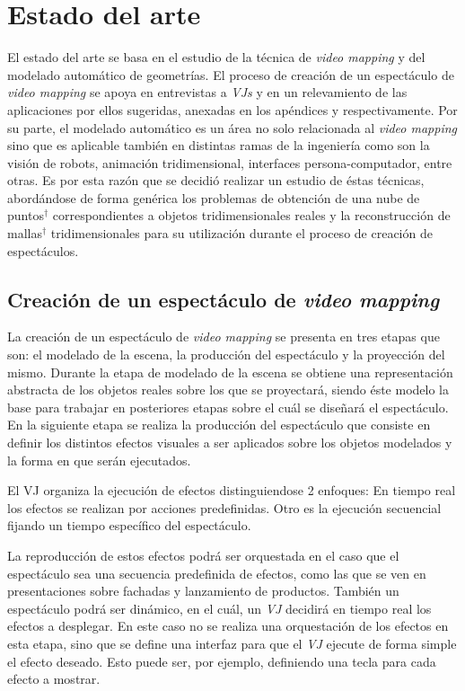 \chapter{Estado del arte}

El estado del arte se basa en el estudio de la técnica de \emph{video mapping} y del modelado automático de geometrías.
El proceso de creación de un espectáculo de \emph{video mapping} se apoya en entrevistas a \emph{VJs} y en un relevamiento de las aplicaciones por ellos sugeridas, anexadas en los apéndices  y  respectivamente.
Por su parte, el modelado automático es un área no solo relacionada al \emph{video mapping} sino que es aplicable también en distintas ramas de la ingeniería como son la visión de robots, animación tridimensional, interfaces persona-computador, entre otras. Es por esta razón que se decidió realizar un estudio de éstas técnicas, abordándose de forma genérica los problemas de obtención de una nube de puntos$^\dagger$ correspondientes a objetos tridimensionales reales y la reconstrucción de mallas$^\dagger$ tridimensionales para su utilización durante el proceso de creación de espectáculos.

\section{Creación de un espectáculo de \emph{video mapping}}

La creación de un espectáculo de \emph{video mapping} se presenta en tres etapas que son: el modelado de la escena, la producción del espectáculo y la proyección del mismo.
Durante la etapa de modelado de la escena se obtiene una representación abstracta de los objetos reales sobre los que se proyectará, siendo éste modelo la base para trabajar en posteriores etapas sobre el cuál se diseñará el espectáculo.
En la siguiente etapa se realiza la producción del espectáculo que consiste en definir los distintos efectos visuales a ser aplicados sobre los objetos modelados y la forma en que serán ejecutados.

El VJ organiza la ejecución de efectos distinguiendose 2 enfoques: En tiempo real los efectos se realizan por acciones predefinidas. Otro es la ejecución secuencial fijando un tiempo específico del espectáculo.

La reproducción de estos efectos podrá ser orquestada en el caso que el espectáculo sea una secuencia predefinida de efectos, como las que se ven en presentaciones sobre fachadas y lanzamiento de productos.
También un espectáculo podrá ser dinámico, en el cuál, un \emph{VJ} decidirá en tiempo real los efectos a desplegar.
En este caso no se realiza una orquestación de los efectos en esta etapa, sino que se define una interfaz para que el \emph{VJ} ejecute de forma simple el efecto deseado.
Esto puede ser, por ejemplo, definiendo una tecla para cada efecto a mostrar.

